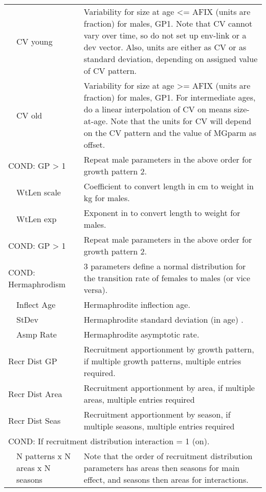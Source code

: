 \begin{longtable}{p{1cm} p{2.5cm} p{10cm}}
	\Tstrut & CV young & Variability for size at age <= AFIX (units are fraction) for males, GP1.  Note that CV cannot vary over time, so do not set up env-link or a dev vector.  Also, units are either as CV or as standard deviation, depending on assigned value of CV pattern.\\
	& CV old &  Variability for size at age >= AFIX (units are fraction) for males, GP1. For intermediate ages, do a linear interpolation of CV on means size-at-age.  Note that the units for CV will depend on the CV pattern and the value of MGparm as offset.\\
	\multicolumn{2}{l}{COND: GP > 1} & Repeat male parameters in the above order for growth pattern 2.\\
	\hline

	\Tstrut & WtLen scale & Coefficient to convert length in cm to weight in kg for males.\\
    & WtLen exp & Exponent in to convert length to weight for males.\Bstrut\\
	\hline

	\multicolumn{2}{l}{COND: GP > 1} \Tstrut & Repeat male parameters in the above order for growth pattern 2.\\
	\hline

	\multicolumn{2}{l}{COND: Hermaphrodism} \Tstrut & 3 parameters define a normal distribution for the transition rate of females to males (or vice versa).\\
	& Inflect Age & Hermaphrodite inflection age.\\
	& StDev & Hermaphrodite standard deviation (in age) .\\
	& Asmp Rate & Hermaphrodite asymptotic rate.\Bstrut\\
	\hline

	\multicolumn{2}{l}{Recr Dist GP} \Tstrut & Recruitment apportionment by growth pattern, if multiple growth patterns, multiple entries required.\\
	\multicolumn{2}{l}{Recr Dist Area} & Recruitment apportionment by area, if multiple areas, multiple entries required\\
	\multicolumn{2}{l}{Recr Dist Seas} & Recruitment apportionment by season, if multiple seasons, multiple entries required\Bstrut\\
	\hline

	\multicolumn{3}{l}{COND:  If recruitment distribution interaction = 1 (on).} \Tstrut \\
	& N patterns x N areas x N seasons & Note that the order of recruitment distribution parameters has areas then seasons for main effect, and seasons then areas for interactions.\Bstrut\\
	\hline


\end{longtable}

